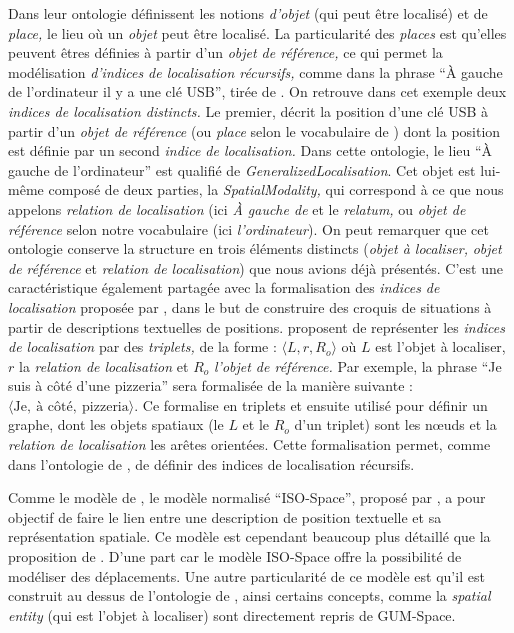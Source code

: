 Dans leur ontologie \textcite{Bateman2010} définissent les notions
\emph{d'objet} (qui peut être localisé) et de \emph{place,} le lieu où
un \emph{objet} peut être localisé. La particularité des \emph{places}
est qu'elles peuvent êtres définies à partir d'un \emph{objet de
  référence,} ce qui permet la modélisation \emph{d'indices de
  localisation récursifs,} comme dans la phrase \enquote{À gauche de
  l'ordinateur il y a une clé USB}, tirée de
\textcite{Bateman2010}. On retrouve dans cet exemple deux
\emph{indices de localisation distincts.} Le premier, décrit la
position d'une clé USB à partir d'un \emph{objet de référence} (ou
\emph{place} selon le vocabulaire de \textcite{Bateman2010}) dont la
position est définie par un second \emph{indice de localisation.} Dans
cette ontologie, le lieu \enquote{À gauche de l'ordinateur} est
qualifié de \emph{GeneralizedLocalisation}. Cet objet est lui-même
composé de deux parties, la \emph{SpatialModality,} qui correspond à
ce que nous appelons \emph{relation de localisation} (ici \emph{À
  gauche de} et le \emph{relatum,} ou \emph{objet de référence} selon
notre vocabulaire (ici \emph{l'ordinateur}). On peut remarquer que cet
ontologie conserve la structure en trois éléments distincts
(\emph{objet à localiser,} \emph{objet de référence} et \emph{relation
  de localisation}) que nous avions déjà présentés. C'est une
caractéristique également partagée avec la formalisation des
\emph{indices de localisation} proposée par \textcite{Vasardini2013},
dans le but de construire des croquis de situations à partir de
descriptions textuelles de positions. \textcite{Vasardini2013}
proposent de représenter les \emph{indices de localisation} par des
\emph{triplets,} de la forme : \(\langle L, r, R_o\rangle\) où \(L\)
est l'objet à localiser, \(r\) la \emph{relation de localisation} et
\(R_o\) \emph{l'objet de référence.} Par exemple, la phrase
\enquote{Je suis à côté d'une pizzeria} sera formalisée de la manière
suivante :
\(\langle \text{Je},\ \text{à côté},\ \text{pizzeria} \rangle\). Ce
formalise en triplets et ensuite utilisé pour définir un graphe, dont
les objets spatiaux (\ie le \(L\) et le \(R_o\) d'un triplet) sont les
nœuds et la \emph{relation de localisation} les arêtes
orientées. Cette formalisation permet, comme dans l'ontologie de
\textcite{Bateman2010}, de définir des indices de localisation
récursifs.

Comme le modèle de \textcite{Vasardini2013}, le modèle normalisé
\enquote{ISO-Space}, proposé par \textcite{Pustejovsky2017}, a pour
objectif de faire le lien entre une description de position textuelle
et sa représentation spatiale. Ce modèle est cependant beaucoup plus
détaillé que la proposition de \textcite{Vasardini2013}. D'une part
car le modèle ISO-Space offre la possibilité de modéliser des
déplacements. Une autre particularité de ce modèle est qu'il est
construit au dessus de l'ontologie de \textcite{Bateman2010}, ainsi
certains concepts, comme la \emph{spatial entity} (qui est l'objet à
localiser) sont directement repris de GUM-Space.

